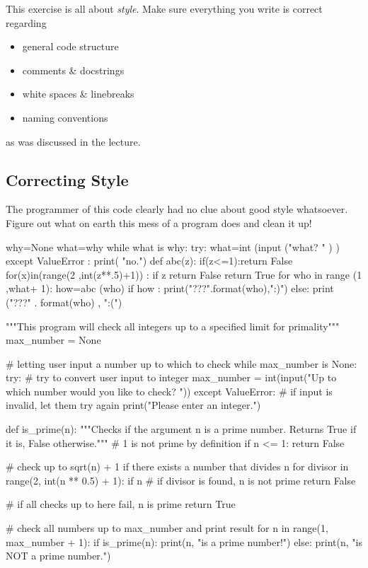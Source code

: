 This exercise is all about \textit{style}. Make sure everything you write is correct regarding

\begin{itemize}
    \item general code structure
    \item comments \& docstrings
    \item white spaces \& linebreaks
    \item naming conventions
\end{itemize}

\noindent as was discussed in the lecture.

\subsection{Correcting Style}

The programmer of this code clearly had no clue about good style whatsoever. Figure out what on earth this mess of a program does and clean it up!

\begin{pythoncode}
why=None
what=why
while what is why:
    try:
        what=int (input ("what? " ) )
    except ValueError :
        print(   "no.")
def abc(z):
    if(z<=1):return False
    for(x)in(range(2  ,int(z**.5)+1))  :
        if z  %
            return False
    return True
for who   in range (1 ,what+   1):
    how=abc (who)
    if how :
        print("{}???".format(who),":)")
    else:
        print ("{}???" . format(who) , ":(")

\end{pythoncode}

\begin{solution}
    \begin{pythoncode}
"""This program will check all integers up to a specified limit for primality"""
max_number = None

# letting user input a number up to which to check
while max_number is None:
    try:
        # try to convert user input to integer
        max_number = int(input("Up to which number would you like to check? "))
    except ValueError:
        # if input is invalid, let them try again
        print("Please enter an integer.")

def is_prime(n):
    """Checks if the argument n is a prime number. Returns True if it is, False otherwise."""
    # 1 is not prime by definition
    if n <= 1:
        return False

    # check up to sqrt(n) + 1 if there exists a number that divides n
    for divisor in range(2, int(n ** 0.5) + 1):
        if n %
            # if divisor is found, n is not prime
            return False

    # if all checks up to here fail, n is prime
    return True

# check all numbers up to max_number and print result
for n in range(1, max_number + 1):
    if is_prime(n):
        print(n, "is a prime number!")
    else:
        print(n, "is NOT a prime number.")
    \end{pythoncode}

\end{solution}


